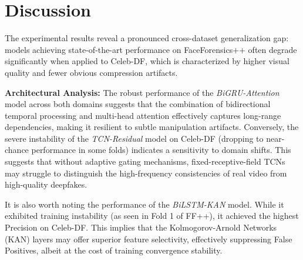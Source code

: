 \documentclass[conference]{IEEEtran}
\begin{document}


\section{Discussion}
The experimental results reveal a pronounced cross-dataset generalization gap: models achieving state-of-the-art performance on FaceForensics++ often degrade significantly when applied to Celeb-DF, which is characterized by higher visual quality and fewer obvious compression artifacts.

\textbf{Architectural Analysis:} The robust performance of the \textit{BiGRU-Attention} model across both domains suggests that the combination of bidirectional temporal processing and multi-head attention effectively captures long-range dependencies, making it resilient to subtle manipulation artifacts. Conversely, the severe instability of the \textit{TCN-Residual} model on Celeb-DF (dropping to near-chance performance in some folds) indicates a sensitivity to domain shifts. This suggests that without adaptive gating mechanisms, fixed-receptive-field TCNs may struggle to distinguish the high-frequency consistencies of real video from high-quality deepfakes.

It is also worth noting the performance of the \textit{BiLSTM-KAN} model. While it exhibited training instability (as seen in Fold 1 of FF++), it achieved the highest Precision on Celeb-DF. This implies that the Kolmogorov-Arnold Networks (KAN) layers may offer superior feature selectivity, effectively suppressing False Positives, albeit at the cost of training convergence stability.
\end{document}
